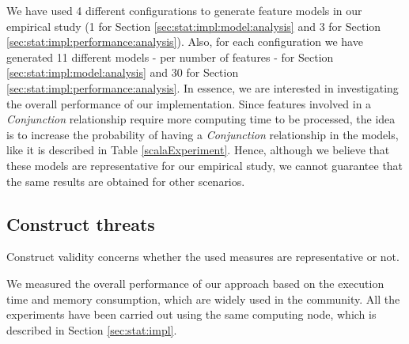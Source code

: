We have used 4 different configurations to generate feature models in our empirical study (1 for Section \ref{sec:stat:impl:model:analysis} and 3 for Section \ref{sec:stat:impl:performance:analysis}).
Also, for each configuration we have generated 11 different models - per number of features - for Section \ref{sec:stat:impl:model:analysis} and 30 for Section \ref{sec:stat:impl:performance:analysis}. In essence, we are interested in investigating the overall performance of our implementation. Since features involved in a \textit{Conjunction} relationship require more computing time to be processed, the idea is to increase the probability of having a \textit{Conjunction} relationship in the models, like it is described in Table \ref{scalaExperiment}. Hence, although we believe that these models are representative for our empirical study, we cannot guarantee that the same results are obtained for other scenarios.


\subsection{Construct threats}

Construct validity concerns whether the used measures are representative or not.

We measured the overall performance of our approach based on the execution time and memory consumption,
which are widely used in the community. All the experiments have been carried out using the same computing node, which is described in Section \ref{sec:stat:impl}.
